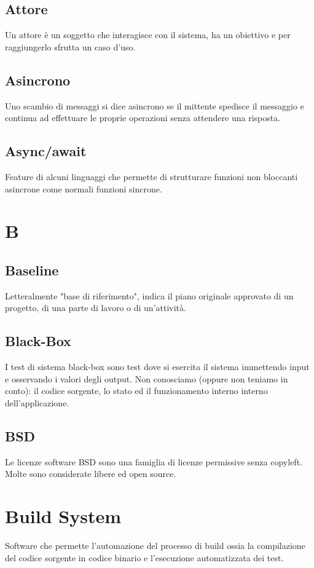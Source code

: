 \subsection*{Attore}
Un attore è un soggetto che interagisce con il sistema, ha un obiettivo e per raggiungerlo sfrutta un caso d'uso\glo. 

\subsection*{Asincrono}
Uno scambio di messaggi si dice asincrono se il mittente spedisce il messaggio e continua ad effettuare le proprie operazioni senza attendere una risposta.

\subsection*{Async/await}
Feature di alcuni linguaggi che permette di strutturare funzioni non bloccanti asincrone come normali funzioni sincrone.

\clearpage
\section*{B}

\subsection*{Baseline}
Letteralmente "base di riferimento", indica il piano originale approvato di un progetto, di una parte di lavoro o di un'attività.

\subsection*{Black-Box}
I test di sistema black-box sono test dove si esercita il sistema immettendo input e osservando i valori degli output.
Non conosciamo (oppure non teniamo in conto): il codice sorgente, lo stato ed il funzionamento interno interno dell’applicazione.

\subsection*{BSD}
Le licenze software BSD sono una famiglia di licenze permissive senza copyleft. Molte sono considerate libere ed open source.

\section*{Build System}
Software che permette l'automazione del processo di build ossia la compilazione del codice sorgente in codice binario e l'esecuzione automatizzata dei test. 

